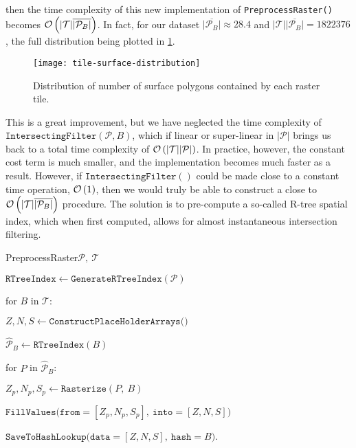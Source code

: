 %
then the time complexity of this new implementation of \texttt{PreprocessRaster()} becomes $\mathcal{O}\left(|\mathcal{T}|\overline{|\mathcal{P}_B|}\right)$.
In fact, for our dataset $\overline{|\mathcal{P}_B|} \approx \num{28.4}$ and $|\mathcal{T}|\overline{|\mathcal{P}_B|} = \num{1822376}$, the full distribution being plotted in \cref{fig:tile-surface-distribution}.
\begin{figure}
  \texttt{[image: tile-surface-distribution]}
  \caption{%
    Distribution of number of surface polygons contained by each raster tile.
  }%
  \label{fig:tile-surface-distribution}
\end{figure}
This is a great improvement, but we have neglected the time complexity of $\texttt{IntersectingFilter}(\mathcal{P}, B)$, which if linear or super-linear in $|\mathcal{P}|$ brings us back to a total time complexity of $\mathcal{O}\left(|\mathcal{T}||\mathcal{P}|\right)$.
In practice, however, the constant cost term is much smaller, and the implementation becomes much faster as a result.
However, if $\texttt{IntersectingFilter}()$ could be made close to a constant time operation, $\mathcal{O}\left(1\right)$, then we would truly be able to construct a close to $\mathcal{O}\left(|\mathcal{T}|\overline{|\mathcal{P}_B|}\right)$ procedure.
The solution is to pre-compute a so-called R-tree spatial index, which when first computed, allows for almost instantaneous intersection filtering\cite{rtree}.
\begin{pseudofunc}{PreprocessRaster}{$\mathcal{P},~\mathcal{T}$}
  \item $\texttt{RTreeIndex} \leftarrow \texttt{GenerateRTreeIndex}(\mathcal{P})$
  \item for $B$ in $\mathcal{T}$:
  \begin{pseudoloop}
    \item $Z, N, S \leftarrow \texttt{ConstructPlaceHolderArrays()}$
    \item $\hat{\mathcal{P}}_B \leftarrow \texttt{RTreeIndex}(B)$
    \item for $P$ in $\hat{\mathcal{P}}_B$:
    \begin{pseudoloop}
      \item $Z_p, N_p, S_p \leftarrow \texttt{Rasterize}(P,~B)$
      \item $\texttt{FillValues(from}=[Z_p, N_p, S_p],~\texttt{into}=[Z, N, S])$
    \end{pseudoloop}
    \item $\texttt{SaveToHashLookup(data}=[Z, N, S],~\texttt{hash}=B)$.
  \end{pseudoloop}
\end{pseudofunc}

